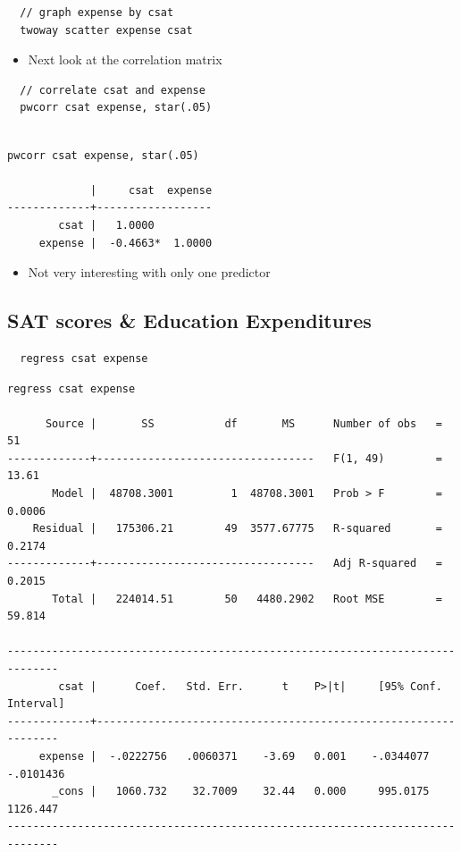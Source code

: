 \documentclass[]{book}
\providecommand{\tightlist}{%
  \setlength{\itemsep}{0pt}\setlength{\parskip}{0pt}}
\begin{document}
\begin{verbatim}
  // graph expense by csat
  twoway scatter expense csat
\end{verbatim}

\begin{itemize}
\tightlist
\item
  Next look at the correlation matrix
\end{itemize}

\begin{verbatim}
  // correlate csat and expense
  pwcorr csat expense, star(.05)
\end{verbatim}

\begin{verbatim}

pwcorr csat expense, star(.05)

             |     csat  expense
-------------+------------------
        csat |   1.0000 
     expense |  -0.4663*  1.0000
\end{verbatim}

\begin{itemize}
\tightlist
\item
  Not very interesting with only one predictor
\end{itemize}

\hypertarget{sat-scores-education-expenditures}{%
\subsection{SAT scores \& Education Expenditures}\label{sat-scores-education-expenditures}}

\begin{verbatim}
  regress csat expense
\end{verbatim}

\begin{verbatim}
regress csat expense

      Source |       SS           df       MS      Number of obs   =        51
-------------+----------------------------------   F(1, 49)        =     13.61
       Model |  48708.3001         1  48708.3001   Prob > F        =    0.0006
    Residual |   175306.21        49  3577.67775   R-squared       =    0.2174
-------------+----------------------------------   Adj R-squared   =    0.2015
       Total |   224014.51        50   4480.2902   Root MSE        =    59.814

------------------------------------------------------------------------------
        csat |      Coef.   Std. Err.      t    P>|t|     [95% Conf. Interval]
-------------+----------------------------------------------------------------
     expense |  -.0222756   .0060371    -3.69   0.001    -.0344077   -.0101436
       _cons |   1060.732    32.7009    32.44   0.000     995.0175    1126.447
------------------------------------------------------------------------------
\end{verbatim}
\end{document}
